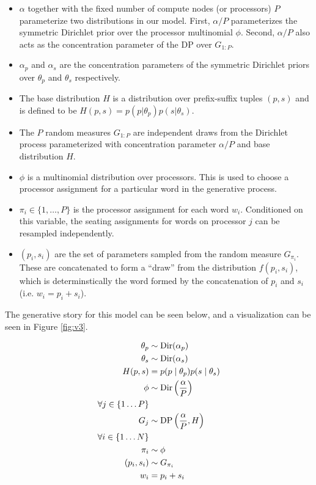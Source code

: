 \begin{itemize}

\item $\alpha$ together with the fixed number of compute nodes (or
  processors) $P$ parameterize two distributions in our model. First,
  $\alpha/P$ parameterizes the symmetric Dirichlet prior over the
  processor multinomial $\phi$. Second, $\alpha/P$ also acts as the
  concentration parameter of the DP over $G_{1:P}$.

\item $\alpha_p$ and $\alpha_s$ are the concentration parameters of
  the symmetric Dirichlet priors over $\theta_p$ and $\theta_s$
  respectively.

\item The base distribution $H$ is a distribution over prefix-suffix
  tuples $(p, s)$ and is defined to be $H(p, s) = p(p | \theta_p) p(s
  | \theta_s)$.

\item The $P$ random measures $G_{1:P}$ are independent draws from the
  Dirichlet process parameterized with concentration parameter
  $\alpha/P$ and base distribution $H$.

\item $\phi$ is a multinomial distribution over processors. This is
  used to choose a processor assignment for a particular word in the
  generative process.

\item $\pi_i \in \{1, \ldots, P\}$ is the processor assignment for
  each word $w_i$. Conditioned on this variable, the seating
  assignments for words on processor $j$ can be resampled
  independently.

\item $(p_i, s_i)$ are the set of parameters sampled from the random
  measure $G_{\pi_i}$. These are concatenated to form a ``draw'' from
  the distribution $f(p_i, s_i)$, which is determinstically the word
  formed by the concatenation of $p_i$ and $s_i$ (i.e. $w_i = p_i +
  s_i$).

\end{itemize}

The generative story for this model can be seen below, and a
visualization can be seen in Figure \ref{fig:v3}.

\begin{align*}
  \theta_p & \sim \mathrm{Dir}(\alpha_p) \\
  \theta_s & \sim \mathrm{Dir}(\alpha_s) \\
  H(p, s) & = p(p \mid \theta_p) p(s \mid \theta_s) \\
  \phi & \sim \mathrm{Dir}\left(\frac{\alpha}{P}\right) \\
  \forall j \in \{1 \dots P\} \\
  G_j & \sim \mathrm{DP}\left(\frac{\alpha}{P}, H\right)\\
  \forall i \in \{1 \dots N\} \\
  \pi_i & \sim \phi \\
  (p_i, s_i) & \sim G_{\pi_i} \\
  w_i & = p_i+s_i
\end{align*}

